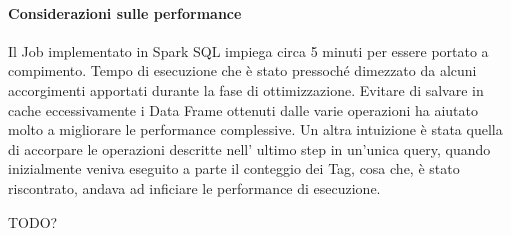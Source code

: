   \paragraph{Considerazioni sulle performance}\label{par:job1:spark:performance}

  Il Job implementato in Spark SQL impiega circa 5 minuti per essere portato a compimento.
  Tempo di esecuzione che è stato pressoché dimezzato da alcuni accorgimenti apportati durante la fase di ottimizzazione.
  Evitare di salvare in cache eccessivamente i Data Frame ottenuti dalle varie operazioni ha aiutato molto a migliorare
  le performance complessive.
  Un altra intuizione è stata quella di accorpare le operazioni descritte nell' ultimo step in un'unica query, quando inizialmente
  veniva eseguito a parte il conteggio dei Tag, cosa che, è stato riscontrato, andava ad inficiare le performance di esecuzione.

  TODO?
